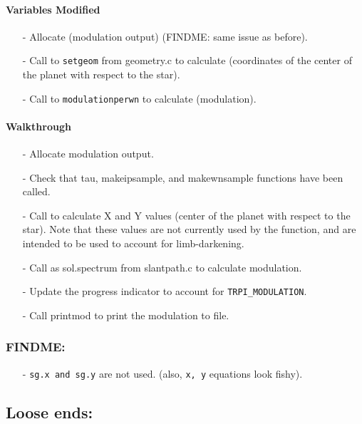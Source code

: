 \documentclass[letterpaper,12pt]{article}
\begin{document}
\paragraph{Variables Modified}
\begin{enumerate}[leftmargin=10pt, noitemsep, parsep=0pt, topsep=0ex]
\item[-] Allocate  (modulation output) (FINDME: same issue as before).
\item[-] Call to {\tt setgeom} from geometry.c to calculate  (coordinates of the center of the planet with respect to the star).
\item[-] Call to {\tt modulationperwn} to calculate  (modulation).
\end{enumerate}

\paragraph{Walkthrough}
\begin{enumerate}[leftmargin=10pt, noitemsep, parsep=0pt, topsep=0ex]
\item[-] Allocate modulation output.
\item[-] Check that tau, makeipsample, and makewnsample functions have been called.
\item[-] Call  to calculate X and Y values (center of the planet with respect to the star). Note that these values are not currently used by the function, and are intended to be used to account for limb-darkening.
\item[-] Call  as sol.spectrum from slantpath.c to calculate modulation.
\item[-] Update the progress indicator to account for {\tt TRPI\_MODULATION}.
\item[-] Call printmod to print the modulation to file.
\end{enumerate}

\subsubsection{FINDME:}
\begin{enumerate}[leftmargin=10pt, noitemsep, parsep=0pt, topsep=0ex]
\item[-] {\tt sg.x and sg.y} are not used. (also, {\tt x, y} equations
  look fishy).
\end{enumerate}

\newpage
\subsection{Loose ends:}
\end{document}
